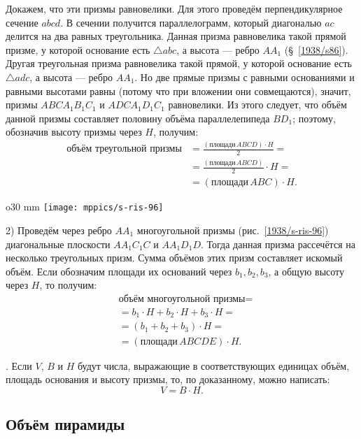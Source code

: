 Докажем, что эти призмы равновелики.
Для этого проведём перпендикулярное сечение $abcd$.
В сечении получится параллелограмм, который диагональю $ac$ делится на два равных треугольника.
Данная призма равновелика такой прямой призме, у которой основание есть $\triangle abc$, а высота — ребро $AA_1$ (§~\ref{1938/s86}).
Другая треугольная призма равновелика такой прямой, у которой основание есть $\triangle adc$, а высота — ребро $AA_1$.
Но две прямые призмы с равными основаниями и равными высотами равны (потому что при вложении они совмещаются), значит, призмы $ABCA_1B_1C_1$ и $ADCA_1D_1C_1$ равновелики.
Из этого следует, что объём данной призмы составляет половину объёма параллелепипеда $BD_1$;
поэтому, обозначив высоту призмы через $H$, получим:
\begin{align*}
\text{объём треугольной призмы}
&=
\frac{(\text{площади}\,ABCD)\cdot H}2=
\\
&=
\frac{(\text{площади}\,ABCD)}2\cdot H=
\\
&=
(\text{площади}\,ABC)\cdot H.
\end{align*}

{

\begin{wrapfigure}[12]{o}{30 mm}
\vskip-6mm
\centering
\texttt{[image: mppics/s-ris-96]}
\caption{}\label{1938/s-ris-96}
\vskip-0mm
\end{wrapfigure}

2) Проведём через ребро $AA_1$ многоугольной призмы (рис.~\ref{1938/s-ris-96}) диагональные плоскости $AA_1C_1C$ и $AA_1D_1D$.
Тогда данная призма рассечётся на несколько треугольных призм.
Сумма объёмов этих призм составляет искомый объём.
Если обозначим площади их оснований через $b_1,b_2,b_3$, а общую высоту через $H$, то получим: 
\begin{align*}
&\text{объём многоугольной призмы}=
\\
&= b_1\cdot H + b_2 \cdot H+ b_3\cdot H=
\\
&=(b_1+ b_2+b_3)\cdot H = 
\\
&=(\text{площади}\, ABCDE)\cdot H.
\end{align*}

}

\mbox{.}
Если $V$, $B$ и $H$ будут числа, выражающие в соответствующих единицах объём, площадь основания и высоту призмы, то, по доказанному, можно написать:
\[V = B\cdot H.\]



\subsection*{Объём пирамиды}


